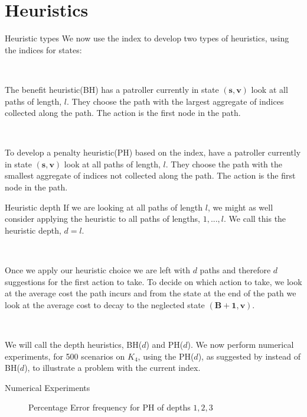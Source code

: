 \documentclass[10pt]{beamer}
\begin{document}
\section{Heuristics}
\begin{frame}{Heuristic types}
We now use the index to develop two types of heuristics, using the indices for states:

\
\pause

\begin{definition}
The benefit heuristic(BH) has a patroller currently in state $(\bm{s},\bm{v})$ look at all paths of length, $l$. They choose the path with the largest aggregate of indices collected along the path. The action is the first node in the path.
\end{definition}

\
\pause

\begin{definition}
To develop a penalty heuristic(PH) based on the index, have a patroller currently in state $(\bm{s},\bm{v})$ look at all paths of length, $l$. They choose the path with the smallest aggregate of indices not collected along the path. The action is the first node in the path.
\end{definition}

\end{frame}

\begin{frame}{Heuristic depth}
If we are looking at all paths of length $l$, we might as well consider applying the heuristic to all paths of lengths, $1,...,l$. We call this the heuristic depth, $d=l$.

\

Once we apply our heuristic choice we are left with $d$ paths and therefore $d$ suggestions for the first action to take. To decide on which action to take, we look at the average cost the path incurs and from the state at the end of the path we look at the average cost to decay to the neglected state $(\bm{B+1},\bm{v})$.

\

We will call the depth heuristics, BH($d$) and PH($d$). We now perform numerical experiments, for 500 scenarios on $K_{4}$, using the PH($d$), as suggested by \cite{Lin2013} instead of BH($d$), to illustrate a problem with the current index.

\end{frame}

\begin{frame}{Numerical Experiments}

\begin{figure}[H]
\begin{center}
\resizebox{\linewidth}{!}{

}
\end{center}
\caption{Percentage Error frequency for PH of depths $1,2,3$}
\end{figure}

\end{frame}
\end{document}
